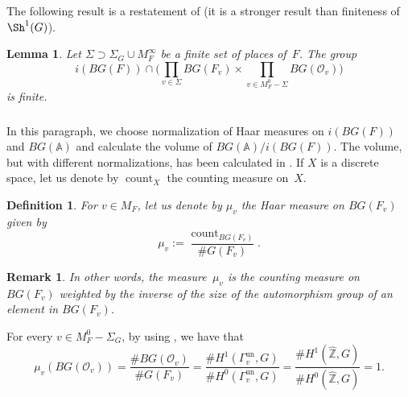 \documentclass[a4paper,english,12pt]{amsart}
\newcommand{\GG}{ G}
\newcommand{\ZZ}{\mathbb{Z}}
\newcommand{\Ov}{\mathcal O _v}
\newcommand{\AAA}{\mathbb A}
\DeclareMathOperator{\coun}{count}
\DeclareMathOperator{\un}{un}
\newtheorem{mydef}[equation]{Definition}
\newtheorem{lem}[equation]{Lemma}
\newtheorem{rem}[equation]{Remark}
\numberwithin{equation}{subsection}
\begin{document}
The following result is a restatement of \cite[Theorem 8.3.20 (ii)]{CohomologyNF} (it is a stronger result than finiteness of $\Sh^1(G)$).
\begin{lem}\label{finlocun}
Let $\Sigma\supset\Sigma_G\cup M_F^{\infty}$ be a finite set of places of~$F$. The group $$i(BG(F))\cap\bigg(\prod_{v\in \Sigma}BG(F_v)\times\prod_{v\in M_F^0-\Sigma}B\GG(\Ov)\bigg)$$ is finite.
\end{lem}
\subsubsection{} In this paragraph, we choose normalization of Haar measures on $i(BG(F))$ and $BG(\AAA)$ and calculate the volume of $BG(\AAA)/i(BG(F))$. The volume, but with different normalizations, has been calculated in \cite[Chapter I, Theorem 5.6]{ArithmeticDuality}.  %
If $X$ is a discrete space, let us denote by $\coun_X$ the counting measure on~$X$.
\begin{mydef}
For $v\in M_F$, let us denote by $\mu_v$ the Haar measure on $BG(F_v)$ given by $$\mu_v:=\frac{\coun_{BG(F_v)}}{\# G(F_v)}.$$
\end{mydef}
\begin{rem}
\normalfont
In other words, the measure~$\mu_v$ is the counting measure on $BG(F_v)$ weighted by the inverse of the size of the automorphism group of an element in $BG(F_v)$. 
\end{rem}
For every $v\in M_F^0-\Sigma_G$, by using \cite[Lemma 10.14]{Hararicohom}, we have that $$\mu_v(BG(\Ov))=\frac{\# BG(\Ov)}{\# G(F_v)}=\frac{\# H^1(\Gamma_v^{\un}, G)}{\# H^0(\Gamma_v^{\un}, G)}=\frac{\# H^1(\widehat{\ZZ}, G)}{\# H^0(\widehat{\ZZ}, G)}=1.$$
\end{document}
